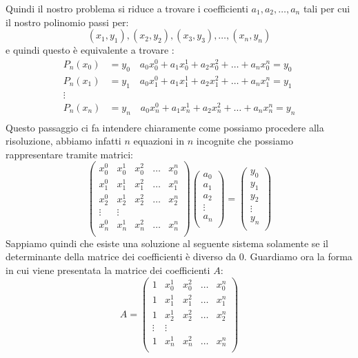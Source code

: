 \documentclass[12pt, a4paper]{book}
\theoremstyle{definition}
\begin{document}
\begin{flushleft}
Quindi il nostro problema si riduce a trovare i coefficienti $a_{1},a_{2},\dots,a_{n}$ tali per cui il nostro polinomio passi per: 
\[ 
	(x_{1}, y_{1}),(x_{2}, y_{2}),(x_{3}, y_{3}), \dots, (x_{n}, y_{n})
\]
e quindi questo è equivalente a trovare :
\[
	\begin{split}
		P_{n}(x_{0}) &= y_{0} \quad a_{0}x_{0}^{0} + a_{1}x_{0}^{1} + a_{2}x_{0}^{2} + \dots + a_{n}x_{0}^{n} = y_{0}  \\
		P_{n}(x_{1}) &= y_{1} \quad a_{0}x_{1}^{0} + a_{1}x_{1}^{1} + a_{2}x_{1}^{2} + \dots + a_{n}x_{1}^{n}  =  y_{1} \\
		\vdots \\
		P_{n}(x_{n}) &= y_{n} \quad a_{0}x_{n}^{0} + a_{1}x_{n}^{1} + a_{2}x_{n}^{2} + \dots + a_{n}x_{n}^{n}  =  y_{n} \\		
	\end{split}
\]
Questo passaggio ci fa intendere chiaramente come possiamo procedere alla risoluzione, abbiamo infatti $n$ equazioni in $n$ incognite che possiamo rappresentare tramite matrici:
\[
	\begin{pmatrix}
		 x_{0}^{0} & x_{0}^{1} & x_{0}^{2} & \dots & x_{0}^{n} \\
		 x_{1}^{0} & x_{1}^{1} & x_{1}^{2} & \dots & x_{1}^{n} \\
		 x_{2}^{0} & x_{2}^{1} & x_{2}^{2} & \dots & x_{2}^{n} \\
		 \vdots & \vdots  \\
		 x_{n}^{0} & x_{n}^{1} & x_{n}^{2} & \dots & x_{n}^{n} \\
	\end{pmatrix}
	\begin{pmatrix}
		a_{0} \\
		a_{1} \\
		a_{2} \\
		\vdots \\
		a_{n} \\
	\end{pmatrix}
	= 
	\begin{pmatrix}
		y_{0} \\
		y_{1} \\
		y_{2} \\
		\vdots \\
		y_{n} \\
	\end{pmatrix}
\]
Sappiamo quindi che esiste una soluzione al seguente sistema solamente se il determinante della matrice dei coefficienti è diverso da 0. 
Guardiamo ora la forma in cui viene presentata la matrice dei coefficienti $A$:
\[ 
	A = 
	\begin{pmatrix}
		 1 & x_{0}^{1} & x_{0}^{2} & \dots & x_{0}^{n} \\
		 1 & x_{1}^{1} & x_{1}^{2} & \dots & x_{1}^{n} \\
		 1 & x_{2}^{1} & x_{2}^{2} & \dots & x_{2}^{n} \\
		 \vdots & \vdots  \\
		 1 & x_{n}^{1} & x_{n}^{2} & \dots & x_{n}^{n} \\
	\end{pmatrix}
\]


\end{flushleft}
\end{document}
